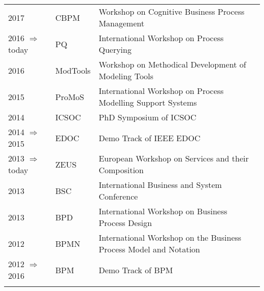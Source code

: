 \begin{tabular}{P{2.5cm}P{2cm}P{11cm}}
2017												& CBPM		& Workshop on Cognitive Business Process Management \\\noalign{\smallskip}
2016  $\Rightarrow$ today				& PQ				& International Workshop on Process Querying \\\noalign{\smallskip}
2016												& ModTools	& Workshop on Methodical Development of Modeling Tools\\\noalign{\smallskip}
2015												& ProMoS		& International Workshop on Process Modelling Support Systems\\\noalign{\smallskip}
2014												& ICSOC		& PhD Symposium of ICSOC \\\noalign{\smallskip}
2014  $\Rightarrow$ 2015				& EDOC		& Demo Track of IEEE EDOC\\\noalign{\smallskip}
2013  $\Rightarrow$ today				& ZEUS			& European Workshop on Services and their Composition\\\noalign{\smallskip}
2013												& BSC			& International Business and System Conference \\\noalign{\smallskip}
2013												& BPD			& International Workshop on Business Process Design\\\noalign{\smallskip}
2012												& BPMN		& International Workshop on the Business Process Model and Notation\\\noalign{\smallskip}
2012  $\Rightarrow$ 2016				& BPM			& Demo Track of BPM\\\noalign{\smallskip}
\end{tabular}


\vspace{0.5cm}
\vspace{0.3cm}

